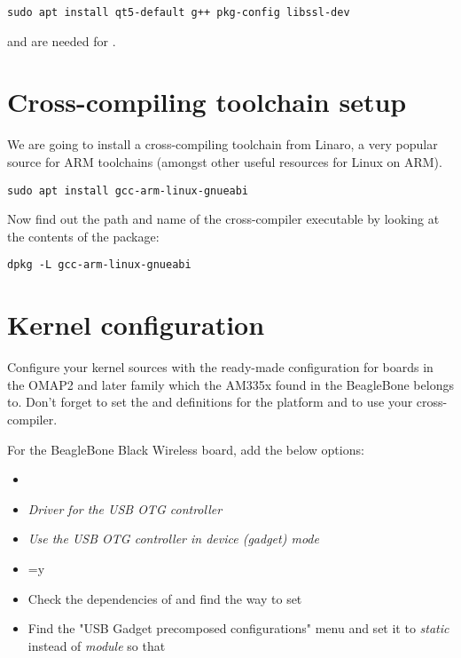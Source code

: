 \begin{verbatim}
sudo apt install qt5-default g++ pkg-config libssl-dev
\end{verbatim}

 and  are needed for .

\section{Cross-compiling toolchain setup}

We are going to install a cross-compiling toolchain from Linaro, a
very popular source for ARM toolchains (amongst other useful resources
for Linux on ARM).

\begin{verbatim}
sudo apt install gcc-arm-linux-gnueabi
\end{verbatim}

Now find out the path and name of the cross-compiler executable by looking at the contents of the package:

\begin{verbatim}
dpkg -L gcc-arm-linux-gnueabi
\end{verbatim}

\section{Kernel configuration}

Configure your kernel sources with the ready-made configuration for boards in
the OMAP2 and later family which the AM335x found in the BeagleBone
belongs to. Don't forget to set the  and
 definitions for the  platform and to
use your cross-compiler.

For the BeagleBone Black Wireless board, add the below options:
\begin{itemize}
  \item {}
  \item {} {\em Driver for the USB OTG
        controller}
  \item {} {\em Use the USB OTG controller
	in device (gadget) mode} 
  \item {}=y
  \item Check the dependencies of 
        and find the way to set 
  \item Find the "USB Gadget precomposed configurations" menu
        and set it to {\em static} instead of {\em module}
	so that 
\end{itemize}

